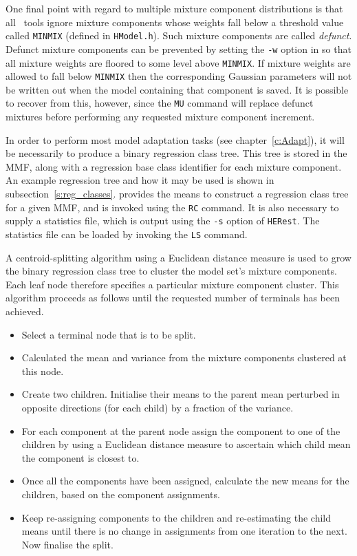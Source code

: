 One final point with regard to multiple mixture component distributions is that
all \HTK\ tools ignore mixture components whose weights fall below a threshold value
called \texttt{MINMIX} (defined in \texttt{HModel.h}).  Such mixture components
are called {\it defunct}.  Defunct mixture components can be
prevented by setting the \texttt{-w} option in  so that all mixture
weights are floored to some level above 
\texttt{MINMIX}.  If 
mixture weights
are allowed to fall below \texttt{MINMIX} then the corresponding Gaussian
parameters will not be written out when the model containing that component
is saved.  It is possible to recover from this, however, since the \texttt{MU} command
will replace defunct mixtures before performing any requested mixture
component increment.


In order to perform most model adaptation tasks (see
chapter~\ref{c:Adapt}), it will be necessarily to produce a binary regression
class tree. 
This tree is stored in the MMF, along with a regression
base class identifier for each mixture component. An example
regression tree and how it may be used is shown in
subsection~\ref{s:reg_classes}.  provides the means to
construct a regression class tree for a given MMF, and is invoked
using the \texttt{RC} command. 
It is also necessary to supply a
statistics file, which is output using the \texttt{-s} option of
\texttt{HERest}. The statistics file can be loaded by invoking the
\texttt{LS} command.

A centroid-splitting algorithm using a Euclidean distance measure is
used to grow the binary regression class tree to cluster the model
set's  mixture components.  Each leaf node therefore specifies a 
particular mixture component cluster. This algorithm proceeds
as follows until the requested number of terminals has been achieved.
\begin{itemize}
\item Select a terminal node that is to be split.
\item Calculated the mean and variance from the mixture components clustered
at this node.
\item Create two children. Initialise their means to the parent mean 
perturbed in opposite directions (for each child) by a fraction of 
the variance.
\item For each component at the parent node assign the component 
to one of the children by using a Euclidean distance measure to 
ascertain which child mean the component is closest to.
\item Once all the components have been assigned, calculate the new
means for the children, based on the component assignments.
\item Keep re-assigning components to the children and re-estimating
the child means until there is no change in assignments from one
iteration to the next. Now finalise the split.
\end{itemize}

